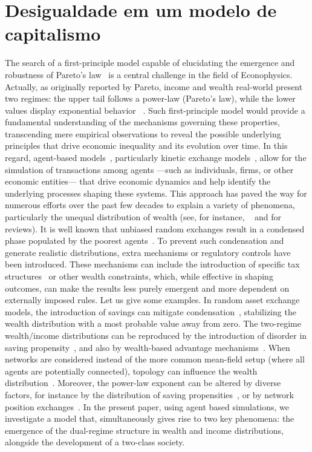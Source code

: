 \newpage
\section{Desigualdade em um modelo de capitalismo}

\label{sec:introduction}

The search of a first-principle model capable of elucidating the emergence and robustness of Pareto's law~\cite{paretonovo} is a central challenge in the field of Econophysics. 
%
Actually, as originally reported by Pareto, income and wealth real-world  present two regimes: the upper tail follows a power-law (Pareto's law), while the lower values display exponential  behavior ~\cite{dragulescu2001,yakovenko2023}.
%
Such  first-principle model would provide a fundamental understanding of the mechanisms governing these properties, transcending mere empirical observations to reveal the possible underlying principles that drive economic inequality and its evolution over time.
%
In this regard, agent-based models~\cite{chakraborti2011}, 
particularly kinetic exchange models~\cite{metzler2023}, allow for the simulation of transactions among agents ---such as individuals, firms, or other economic entities--- that drive economic dynamics and help identify the underlying processes shaping these systems. 
This approach has paved the way for numerous efforts over the past few decades to explain a variety of phenomena, particularly the unequal distribution of wealth (see, for instance, ~\cite{boghosian2014a,metzler2019,chakraborti2000,dragulescu2000,bouchaud2000} and \cite{yakovenko2009,chakraborti2011,chakrabarti2013} for reviews).  
%
It is well known that unbiased random exchanges result in a condensed phase populated by the poorest agents~\cite{boghosian2014a, Cardoso2023}. To prevent such condensation and generate realistic distributions, extra mechanisms or regulatory controls have been introduced. These mechanisms can include the introduction of specific tax structures~\cite{LIMA2022,Calvelli2023,Dias2024} or other wealth constraints, which, while effective in shaping outcomes, can make the results less purely emergent and more dependent on externally imposed rules.
%
Let us give some examples.
In random asset exchange models, the  introduction of savings can mitigate condensation~\cite{chakraborti2000}, stabilizing the wealth distribution with a most probable value away from zero.
The 
two-regime wealth/income distributions can be reproduced by the introduction of disorder in saving propensity~\cite{ Chatterjee2004}, and also by wealth-based advantage mechanisms~\cite{Calvelli2023,Vallejos2018}.  
%
When networks are considered instead of the more common mean-field setup (where all agents are potentially connected), topology can influence the wealth distribution~\cite{KOHLRAUSCH2024}.
Moreover, the power-law exponent can be altered by diverse factors, for instance by the distribution of saving propensities~\cite{AYDINER2018}, or by network position exchanges~\cite{metzler2019}. 
In the present paper, using agent based simulations,  we investigate a model that,  simultaneously gives rise to two key phenomena: the emergence of the dual-regime structure in wealth and income distributions, alongside the development of a two-class society. 

